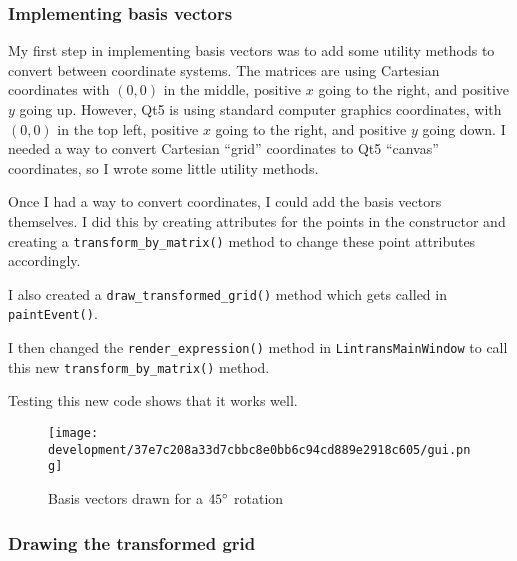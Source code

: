 \documentclass[../main.tex]{subfiles}
\begin{document}
\subsubsection{Implementing basis vectors\label{development:visualizing-matrices:implementing-basis-vectors}}

My first step in implementing basis vectors was to add some utility methods to convert between coordinate systems. The matrices are using Cartesian coordinates with $(0, 0)$ in the middle, positive $x$ going to the right, and positive $y$ going up. However, Qt5 is using standard computer graphics coordinates, with $(0, 0)$ in the top left, positive $x$ going to the right, and positive $y$ going down. I needed a way to convert Cartesian \enquote{grid} coordinates to Qt5 \enquote{canvas} coordinates, so I wrote some little utility methods.


Once I had a way to convert coordinates, I could add the basis vectors themselves. I did this by creating attributes for the points in the constructor and creating a \texttt{transform\_by\_matrix()} method to change these point attributes accordingly.


I also created a \texttt{draw\_transformed\_grid()} method which gets called in \texttt{paintEvent()}.


I then changed the \texttt{render\_expression()} method in \texttt{LintransMainWindow} to call this new \texttt{transform\_by\_matrix()} method.


Testing this new code shows that it works well.

\begin{figure}[H]
	\centering
	\texttt{[image: development/37e7c208a33d7cbbc8e0bb6c94cd889e2918c605/gui.png]}
	\caption{Basis vectors drawn for a $45\degree$ rotation}
	\label{fig:development:37e7c208a33d7cbbc8e0bb6c94cd889e2918c605:gui.png}
\end{figure}

\subsubsection{Drawing the transformed grid\label{development:visualizing-matrices:drawing-the-transformed-grid}}
\end{document}
